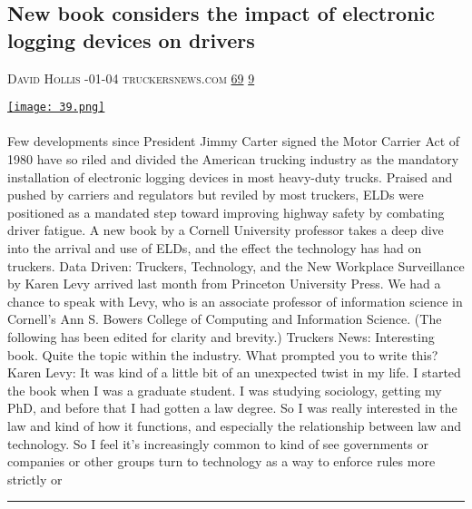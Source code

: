 \documentclass[10pt,a4paper]{article}
\begin{document}
\begin{multicols*}{2}
\begin{minipage}{\linewidth}
\subsection{New book considers the impact of electronic logging devices on drivers}
\textsc{\footnotesize
{\scriptsize\faUser}\space 
David Hollis 
{\scriptsize\faCalendar}-01-04 
{\scriptsize\faGlobe}\space 
truckersnews.com 
{\scriptsize\faThumbsOUp}\space 
\href{http://news.ycombinator.com/item?id=37143716\&utm\_term=comment}{69} 
{\scriptsize\faComments}\space 
\href{http://news.ycombinator.com/item?id=37143716\&utm\_term=comment}{9} 
}
\par\medskip\noindent
\href{https://www.truckersnews.com/home/article/15305066/new-book-considers-the-impact-of-electronic-logging-devices-on-drivers?utm\_source=hackernewsletter\&utm\_medium=email\&utm\_term=books}{
    \texttt{[image: 39.png]}
}
\end{minipage}
\paragraph{}
Few developments since President Jimmy Carter signed the Motor Carrier Act of 1980 have so riled and divided the American trucking industry as the mandatory installation of electronic logging devices in most heavy-duty trucks. Praised and pushed by carriers and regulators but reviled by most truckers, ELDs were positioned as a mandated step toward improving highway safety by combating driver fatigue.
A new book by a Cornell University professor takes a deep dive into the arrival and use of ELDs, and the effect the technology has had on truckers. Data Driven: Truckers, Technology, and the New Workplace Surveillance by Karen Levy arrived last month from Princeton University Press.
We had a chance to speak with Levy, who is an associate professor of information science in Cornell's Ann S. Bowers College of Computing and Information Science. (The following has been edited for clarity and brevity.)
Truckers News: Interesting book. Quite the topic within the industry. What prompted you to write this?
Karen Levy: It was kind of a little bit of an unexpected twist in my life. I started the book when I was a graduate student. I was studying sociology, getting my PhD, and before that I had gotten a law degree. So I was really interested in the law and kind of how it functions, and especially the relationship between law and technology. So I feel it's increasingly common to kind of see governments or companies or other groups turn to technology as a way to enforce rules more strictly or
\par\noindent\textcolor{red}{\rule{\linewidth}{0.2mm}}
\vfill
\null
\noindent\begin{minipage}{\linewidth}

\end{minipage}
\end{multicols*}
\end{document}
